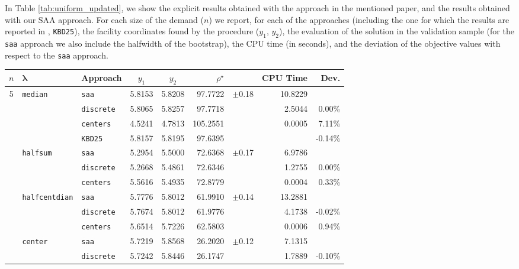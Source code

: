 \documentclass[letter,11pt, reqno]{amsart}
\renewcommand{\;}{\quad}
\theoremstyle{thmstyleone}%
\theoremstyle{thmstyletwo}%
\theoremstyle{thmstylethree}%
\begin{document}
In Table \ref{tab:uniform_updated}, we show the explicit results obtained with the approach in the mentioned paper, and the results obtained with our SAA approach. For each size of the demand ($n$) we report, for each of the approaches (including the one for which the results are reported in \cite{kalczynski2025weber}, \texttt{KBD25}), the facility coordinates found by the procedure ($y_1$, $y_2$), the evaluation of the solution in the validation sample (for the \texttt{saa} approach we also include the halfwidth of the bootstrap), the CPU time (in seconds), and the deviation of the objective values with respect to the \texttt{saa} approach.
\begin{table}[h!]
\setlength{\tabcolsep}{3pt}
\renewcommand{\arraystretch}{0.7}
\centering\begin{adjustbox}{width=0.65\textwidth}
\begin{tabular}{@{} c l l c c r l r r @{}}
\toprule
{$n$} & {$\bm \lambda$} & {Approach} & {$y_1$} & {$y_2$} & {$\rho^\star$} & {} & {CPU Time} & {Dev.} \\
\midrule
{5}
 & {\texttt{median}}
   & \texttt{saa}      & 5.8153 & 5.8208 & 97.7722 & $\pm$0.18 & 10.8229 & {} \\
 & & \texttt{discrete} & 5.8065 & 5.8257 & 97.7718 & {}        & 2.5044  & 0.00\% \\
 & & \texttt{centers}  & 4.5241 & 4.7813 & 105.2551& {}        & 0.0005  & 7.11\% \\
 & & \texttt{KBD25}    & 5.8157 & 5.8195 & 97.6395 & {}        & {}      & -0.14\% \\[2pt]
 & {\texttt{halfsum}}
   & \texttt{saa}      & 5.2954 & 5.5000 & 72.6368 & $\pm$0.17 & 6.9786  & {} \\
 & & \texttt{discrete} & 5.2668 & 5.4861 & 72.6346 & {}        & 1.2755  & 0.00\% \\
 & & \texttt{centers}  & 5.5616 & 5.4935 & 72.8779 & {}        & 0.0004  & 0.33\% \\[2pt]
 & {\texttt{halfcentdian}}
   & \texttt{saa}      & 5.7776 & 5.8012 & 61.9910 & $\pm$0.14 & 13.2881 & {} \\
 & & \texttt{discrete} & 5.7674 & 5.8012 & 61.9776 & {}        & 4.1738  & -0.02\% \\
 & & \texttt{centers}  & 5.6514 & 5.7226 & 62.5803 & {}        & 0.0006  & 0.94\% \\[2pt]
 & {\texttt{center}}
   & \texttt{saa}      & 5.7219 & 5.8568 & 26.2020 & $\pm$0.12 & 7.1315  & {} \\
 & & \texttt{discrete} & 5.7242 & 5.8446 & 26.1747 & {}        & 1.7889  & -0.10\% \\

\end{tabular}
\end{adjustbox}
\end{table}
\end{document}
